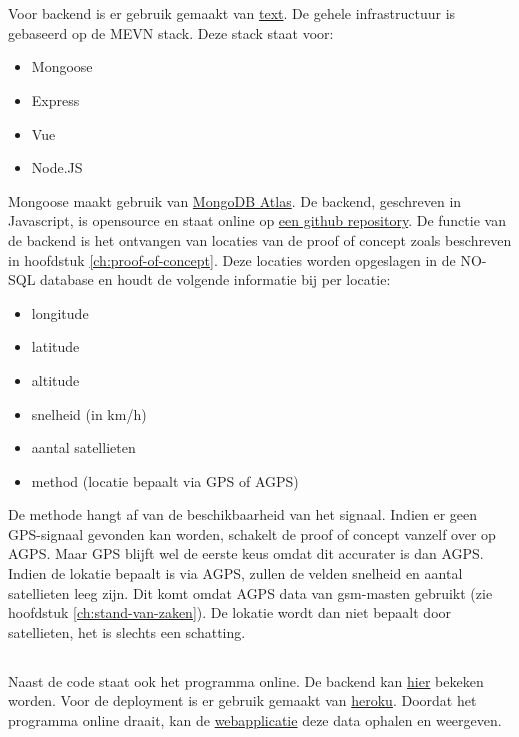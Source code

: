 \chapter{}
\label{ch:backend}

\section{}
Voor backend is er gebruik gemaakt van \href{URL}{text}. De gehele infrastructuur is gebaseerd op de MEVN stack.
Deze stack staat voor:
\begin{itemize}
	\item Mongoose
	\item Express
	\item Vue
	\item Node.JS
\end{itemize}
Mongoose maakt gebruik van \href{https://www.mongodb.com/cloud/atlas}{MongoDB Atlas}. De backend, geschreven in Javascript, is opensource en staat online op \href{https://github.com/IndyVC/bap-backend}{een github repository}.
\newline
De functie van de backend is het ontvangen van locaties van de proof of concept zoals beschreven in hoofdstuk \ref{ch:proof-of-concept}. Deze locaties worden opgeslagen in de NO-SQL database en houdt de volgende informatie bij per locatie:
\begin{itemize}
	\item longitude
	\item latitude
	\item altitude
	\item snelheid (in km/h)
	\item aantal satellieten
	\item method (locatie bepaalt via GPS of AGPS)
\end{itemize}
De methode hangt af van de beschikbaarheid van het signaal. Indien er geen GPS-signaal gevonden kan worden, schakelt de proof of concept vanzelf over op AGPS. Maar GPS blijft wel de eerste keus omdat dit accurater is dan AGPS. Indien de lokatie bepaalt is via AGPS, zullen de velden snelheid en aantal satellieten leeg zijn. Dit komt omdat AGPS data van gsm-masten gebruikt (zie hoofdstuk \ref{ch:stand-van-zaken}). De lokatie wordt dan niet bepaalt door satellieten, het is slechts een schatting. 

\section{}
Naast de code staat ook het programma online. De backend kan \href{https://indy-bap-backend.herokuapp.com/api/locations}{hier} bekeken worden. Voor de deployment is er gebruik gemaakt van \href{www.heroku.com}{heroku}. Doordat het programma online draait, kan de \href{https://indy-bap-frontend.netlify.com/}{webapplicatie} deze data ophalen en weergeven.
 